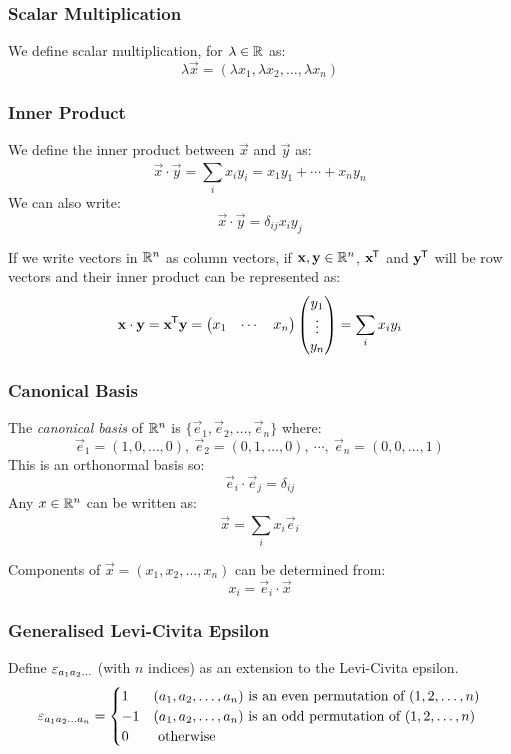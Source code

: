 \documentclass[../main.tex]{subfiles}
\begin{document}
\subsubsection{Scalar Multiplication}
We define scalar multiplication, for $\lambda \in \mathbb{R}$ as:
\[
  \lambda \vec{x} = (\lambda x_1, \lambda x_2, \ldots, \lambda x_n)
\]
\subsubsection{Inner Product}
We define the inner product between $\vec{x}$ and $\vec{y}$ as:
\[
  \vec{x} \cdot \vec{y} = \sum_{i}^{} x_i y_i = x_1 y_1 + \cdots + x_n y_n
\]
We can also write:
\[
  \vec{x} \cdot \vec{y} = \delta_{i j} x_i y_j
\]
\begin{remark}[Note]
  If we write vectors in $\mathbb{R}^{n}$ as column vectors, if $\boldsymbol{\mathbf{x}}, \boldsymbol{\mathbf{y}} \in \mathbb{R}^{n}$, $\boldsymbol{\mathbf{x}}^{{\mkern-1.5mu\mathsf{T}}}$ and $\boldsymbol{\mathbf{y}}^{{\mkern-1.5mu\mathsf{T}}}$ will be row vectors and their inner product can be represented as:
  \[
    \boldsymbol{\mathbf{x}} \cdot \boldsymbol{\mathbf{y}} = \boldsymbol{\mathbf{x}}^{{\mkern-1.5mu\mathsf{T}}} \boldsymbol{\mathbf{y}} =
    \begin{pmatrix}
    x_1 & \cdots & x_n \\
    \end{pmatrix}
    \begin{pmatrix}
    y_1 \\
    \vdots \\
    y_n \\
    \end{pmatrix}
    = \sum_{i}^{} x_i y_i
  \]
\end{remark}
\subsubsection{Canonical Basis}
The \textit{canonical basis} of $\mathbb{R}^{n}$ is $\{\vec{e}_1, \vec{e}_2, \ldots, \vec{e}_n\}$ where:
\[
  \vec{e}_1 = (1, 0, \ldots, 0),\ \vec{e}_2 = (0, 1, \ldots, 0),\ \cdots,\ \vec{e}_n = (0, 0, \ldots, 1)
\]
This is an orthonormal basis so:
\[
  \vec{e}_i \cdot \vec{e}_j = \delta_{i j}
\]
Any $x \in \mathbb{R}^{n}$ can be written as:
\[
  \vec{x} = \sum_{i}^{} x_i \vec{e}_i
\]

Components of $\vec{x} = (x_1, x_2, \ldots, x_n)$ can be determined from:
\[
  x_i = \vec{e}_i \cdot \vec{x}
\]
\subsubsection{Generalised Levi-Civita Epsilon}
Define $\varepsilon_{a_1 a_2 \ldots}$ (with $n$ indices) as an extension to the Levi-Civita epsilon.
\[
  \varepsilon_{a_1 a_2 \ldots a_n} = \begin{cases}
  1 & (a_1, a_2, \ldots, a_n) \text{ is an even permutation of }(1, 2, \ldots, n) \\
  -1 & (a_1, a_2, \ldots, a_n) \text{ is an odd permutation of }(1, 2, \ldots, n) \\
  0 & \text{ otherwise}
  \end{cases}
\]
\end{document}
